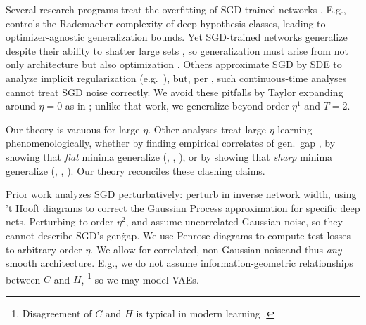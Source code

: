 \documentclass{article}
\theoremstyle{plain}
\theoremstyle{definition}
\begin{document}

    Several research programs treat the overfitting of SGD-trained networks
    \citep{ne17a}.  E.g., \cite{ba17} controls the Rademacher complexity of
    deep hypothesis classes, leading to optimizer-agnostic generalization
    bounds.  Yet SGD-trained networks generalize despite their ability to
    shatter large sets \citep{zh17}, so generalization must arise from not only
    architecture but also optimization \citep{ne17b}.  Others approximate
    SGD by SDE to analyze implicit regularization (e.g.\ \cite{ch18}), but,
    per \cite{ya19a}, such continuous-time analyses cannot treat SGD noise
    correctly.
    We avoid these pitfalls by Taylor expanding around $\eta=0$ as in
    \cite{ro18}; unlike that work, we generalize beyond order $\eta^1$ and
    $T=2$.
    

    Our theory is vacuous for large $\eta$.  Other analyses treat
    large-$\eta$ learning phenomenologically, whether by finding empirical
    correlates of gen.\ gap \citep{li18}, by showing that \emph{flat} minima
    generalize (\cite{ho17}, \cite{ke17}, \cite{wa18}), or by showing that
    \emph{sharp} minima generalize (\cite{st56}, \cite{di17}, \cite{wu18}).
    Our theory reconciles these clashing claims.
    

    Prior work analyzes SGD perturbatively: \cite{dy19} perturb in inverse
    network width, using 't Hooft diagrams to correct the Gaussian Process
    approximation for specific deep nets.  Perturbing to order $\eta^2$,
    \cite{ch18} and \cite{li17} assume uncorrelated Gaussian noise, so they
    cannot describe SGD's gen\. gap.  We use Penrose diagrams to compute test
    losses to arbitrary order $\eta$.  We allow for correlated, non-Gaussian
    noiseand thus \emph{any} smooth architecture.  E.g., we do not assume
    information-geometric relationships between $C$ and
    $H$,
    \footnote{
        Disagreement of $C$ and $H$ is typical in modern learning \citep{ro12,
        ku19}.
    }
    so we may model VAEs. 
\end{document}
